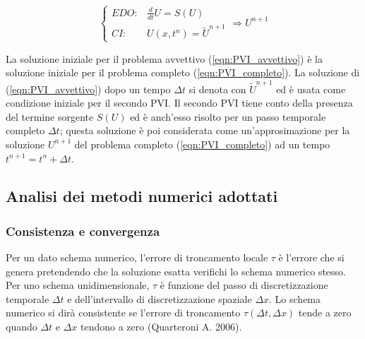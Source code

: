 \documentclass[12pt]{article} %
\begin{document}
\begin{equation}
    \left\{\begin{array}{lr}
        EDO: & \frac{d}{dt}U = S(U)\\
        CI: & U(x,t^n)=\tilde{U}^{n+1}
        \end{array}
    \right. \Longrightarrow U^{n+1}
\end{equation}

\noindent La soluzione iniziale per il problema avvettivo (\ref{eqn:PVI_avvettivo}) è la soluzione iniziale per il problema completo (\ref{eqn:PVI_completo}). La soluzione di (\ref{eqn:PVI_avvettivo}) dopo un tempo $\Delta t$ si denota con $\tilde{U}^{n+1}$ ed è usata come condizione iniziale per il secondo PVI. Il secondo PVI tiene conto della presenza del termine sorgente $S(U)$ ed è anch'esso risolto per un passo temporale completo $\Delta t$; questa soluzione è poi considerata come un'approsimazione per la soluzione $U^{n+1}$ del problema completo (\ref{eqn:PVI_completo}) ad un tempo $t^{n+1}=t^n+\Delta t$.

\subsection{Analisi dei metodi numerici adottati}
\subsubsection{Consistenza e convergenza}
\noindent Per un dato schema numerico, l'errore di troncamento locale $\tau$ è l'errore che si genera pretendendo che la soluzione esatta verifichi lo schema numerico stesso.
Per uno schema unidimensionale, $\tau$ è  funzione del passo di discretizzazione temporale $\Delta t$ e  dell'intervallo di discretizzazione spaziale $\Delta x$. Lo schema numerico si dirà consistente se l'errore di troncamento $\tau(\Delta t, \Delta x)$ tende a zero quando $\Delta t$ e $\Delta x$ tendono a zero (Quarteroni A. 2006).
\end{document}
